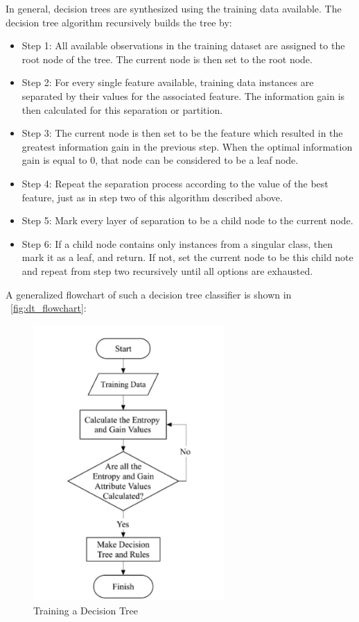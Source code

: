 \begin{appendices}
  In general, decision trees are synthesized using the training data available. The decision tree algorithm recursively builds the tree \cite{bhiksha} by:
  \begin{itemize}
      \item Step 1: All available observations in the training dataset are assigned to the root node of the tree. The current node is then set to the root node.
      \item Step 2: For every single feature available, training data instances are separated by their values for the associated feature. The information gain is then calculated for this separation or partition.
      \item Step 3: The current node is then set to be the feature which resulted in the greatest information gain in the previous step. When the optimal information gain is equal to 0, that node can be considered to be a leaf node.
      \item Step 4: Repeat the separation process according to the value of the best feature, just as in step two of this algorithm described above.
      \item Step 5: Mark every layer of separation to be a child node to the current node.
      \item Step 6: If a child node contains only instances from a singular class, then mark it as a leaf, and return. If not, set the current node to be this child note and repeat from step two recursively until all options are exhausted.
  \end{itemize}

    A generalized flowchart of such a decision tree classifier is shown in ~\autoref{fig:dt_flowchart}:

    \begin{figure}[H]
    \centering
    \includegraphics[width=0.65\textwidth]{images/id3-dt.png}
    \caption{Training a Decision Tree}
    \label{fig:dt_flowchart}
    \end{figure}
    \FloatBarrier



\end{appendices}
